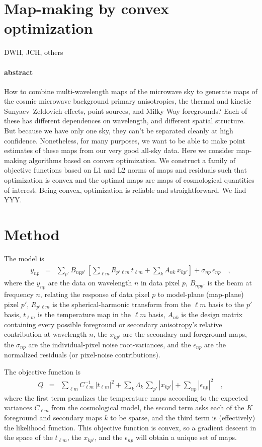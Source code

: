 \documentclass[11pt]{article}
\begin{document}
\section*{Map-making by convex optimization}

\noindent
DWH, JCH, others

\paragraph{abstract}
How to combine multi-wavelength maps of the microwave sky to generate
maps of the cosmic microwave background primary anisotropies, the
thermal and kinetic Sunyaev--Zeldovich effects, point sources, and
Milky Way foregrounds?
Each of these has different dependences on wavelength, and different
spatial structure.
But because we have only one sky, they can't be separated cleanly at
high confidence.
Nonetheless, for many purposes, we want to be able to make point
estimates of these maps from our very good all-sky data.
Here we consider map-making algorithms based on convex optimization.
We construct a family of objective functions based on L1 and L2 norms
of maps and residuals such that optimization is convex and the optimal
maps are maps of cosmological quantities of interest.
Being convex, optimization is reliable and straightforward.
We find YYY.

\section{Method}

The model is
\begin{eqnarray}
  y_{np} &=& \sum_{p'} B_{npp'}\,\left[
      \sum_{\ell m} R_{p'\ell m}\,t_{\ell m}
    + \sum_{k} A_{nk}\,x_{kp'}\right] + \sigma_{np}\,\epsilon_{np} \quad ,
\end{eqnarray}
where the $y_{np}$ are the data on wavelength $n$ in data pixel $p$,
$B_{npp'}$ is the beam at frequency $n$, relating the response of data
pixel $p$ to model-plane (map-plane) pixel $p'$, $R_{p'\ell m}$ is the
spherical-harmonic transform from the $\ell m$ basis to the $p'$
basis, $t_{\ell m}$ is the temperature map in the $\ell m$ basis,
$A_{nk}$ is the design matrix containing every possible foreground or
secondary anisotropy's relative contribution at wavelength $n$, the
$x_{kp'}$ are the secondary and foreground maps, the $\sigma_{np}$ are
the individual-pixel noise root-variances, and the $\epsilon_{np}$ are
the normalized residuals (or pixel-noise contributions).

The objective function is
\begin{eqnarray}
  Q &=&
    \sum_{\ell m} C_{\ell m}^{-1}\,|t_{\ell m}|^2
  + \sum_{k} \Lambda_k\,\sum_{p'} |x_{kp'}|
  + \sum_{np} |\epsilon_{np}|^2 \quad ,
\end{eqnarray}
where the first term penalizes the temperature maps according to the
expected variances $C_{\ell m}$ from the cosmological model, the
second term asks each of the $K$ foreground and secondary maps $k$ to
be sparse, and the third term is (effectively) the likelihood
function.
This objective function is convex, so a gradient descent in the space
of the $t_{\ell m}$, the $x_{kp'}$, and the $\epsilon_{np}$ will
obtain a unique set of maps.
\end{document}
